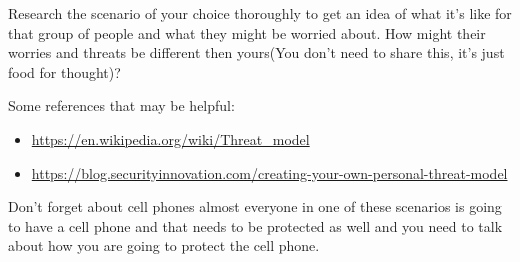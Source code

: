 \documentclass[12pt]{article}
\begin{document}
Research the scenario of your choice thoroughly to get an idea of what it's like for that group of people and what they might be worried about.  How might their worries and threats be different then yours(You don't need to share this, it's just food for thought)? 

Some references that may be helpful:
\begin{itemize}
    \item  \url{https://en.wikipedia.org/wiki/Threat_model}
    \item \url{https://blog.securityinnovation.com/creating-your-own-personal-threat-model}
\end{itemize}

Don't forget about cell phones almost everyone in one of these scenarios is going to have a cell phone and that needs to be protected as well and you need to talk about how you are going to protect the cell phone.
\end{document}
